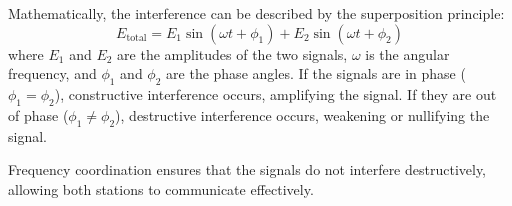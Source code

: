 Mathematically, the interference can be described by the superposition principle:
\[
E_{\text{total}} = E_1 \sin(\omega t + \phi_1) + E_2 \sin(\omega t + \phi_2)
\]
where \(E_1\) and \(E_2\) are the amplitudes of the two signals, \(\omega\) is the angular frequency, and \(\phi_1\) and \(\phi_2\) are the phase angles. If the signals are in phase (\(\phi_1 = \phi_2\)), constructive interference occurs, amplifying the signal. If they are out of phase (\(\phi_1 \neq \phi_2\)), destructive interference occurs, weakening or nullifying the signal.

Frequency coordination ensures that the signals do not interfere destructively, allowing both stations to communicate effectively.


